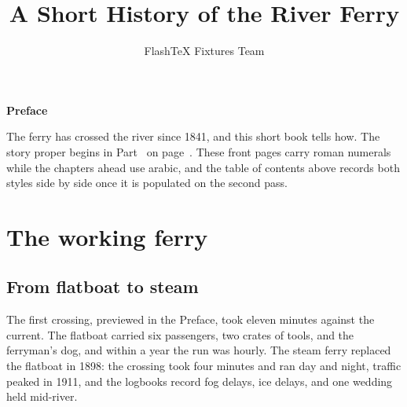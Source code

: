 \documentclass[11pt,openany,oneside]{book}
\title{A Short History of the River Ferry}
\author{FlashTeX Fixtures Team}
\date{}
\begin{document}
\frontmatter
\tableofcontents
{}
{}
{\Large\bfseries Preface\par}
The ferry has crossed the river since 1841, and this short book tells how. The story proper begins in Part~\ref{part:main} on page~\pageref{part:main}. These front pages carry roman numerals while the chapters ahead use arabic, and the table of contents above records both styles side by side once it is populated on the second pass.
\mainmatter
\part{The working ferry}
\label{part:main}
\chapter{From flatboat to steam}
\label{ch:boat}
The first crossing, previewed in the Preface, took eleven minutes against the current. The flatboat carried six passengers, two crates of tools, and the ferryman's dog, and within a year the run was hourly. The steam ferry replaced the flatboat in 1898: the crossing took four minutes and ran day and night, traffic peaked in 1911, and the logbooks record fog delays, ice delays, and one wedding held mid-river.
\end{document}
